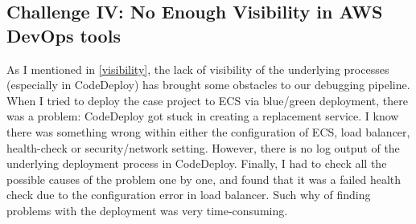 \subsection{Challenge IV: No Enough Visibility in AWS DevOps tools}
As I mentioned in \ref{visibility}, the lack of visibility of the underlying processes (especially in CodeDeploy) has brought some obstacles to our debugging pipeline. When I tried to deploy the case project to ECS via blue/green deployment, there was a problem: CodeDeploy got stuck in creating a replacement service. I know there was something wrong within either the configuration of ECS, load balancer, health-check or security/network setting. However, there is no log output of the underlying deployment process in CodeDeploy. Finally, I had to check all the possible causes of the problem one by one, and found that it was a failed health check due to the configuration error in load balancer. Such why of finding problems with the deployment was very time-consuming.